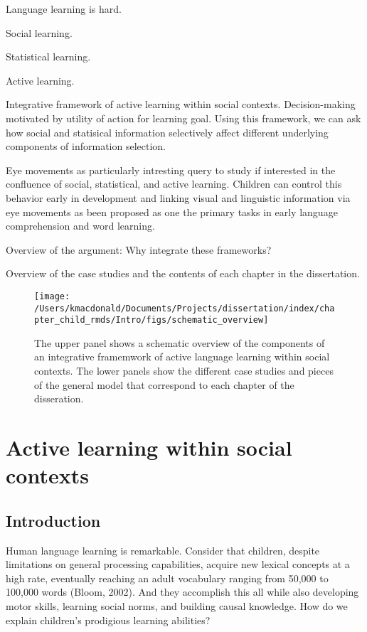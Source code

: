 \documentclass[oneside]{report}
\begin{document}
Language learning is hard.

Social learning.

Statistical learning.

Active learning.

Integrative framework of active learning within social contexts.
Decision-making motivated by utility of action for learning goal. Using
this framework, we can ask how social and statisical information
selectively affect different underlying components of information
selection.

Eye movements as particularly intresting query to study if interested in
the confluence of social, statistical, and active learning. Children can
control this behavior early in development and linking visual and
linguistic information via eye movements as been proposed as one the
primary tasks in early language comprehension and word learning.

Overview of the argument: Why integrate these frameworks?

Overview of the case studies and the contents of each chapter in the
dissertation.
\begin{figure}[t]

{\centering \texttt{[image: /Users/kmacdonald/Documents/Projects/dissertation/index/chapter\_child\_rmds/Intro/figs/schematic\_overview]} 

}

\caption[Schematic overview of the disseration content.]{The upper panel shows a schematic overview of the components of an integrative framemwork of active language learning within social contexts. The lower panels show the different case studies and pieces of the general model that correspond to each chapter of the disseration.}\label{fig:schematic-overview}
\end{figure}
\hypertarget{active-learning-within-social-contexts}{%
\chapter{Active learning within social
contexts}\label{active-learning-within-social-contexts}}

\hypertarget{introduction}{%
\section{Introduction}\label{introduction}}

Human language learning is remarkable. Consider that children, despite
limitations on general processing capabilities, acquire new lexical
concepts at a high rate, eventually reaching an adult vocabulary ranging
from 50,000 to 100,000 words (Bloom, 2002). And they accomplish this all
while also developing motor skills, learning social norms, and building
causal knowledge. How do we explain children's prodigious learning
abilities?
\end{document}
